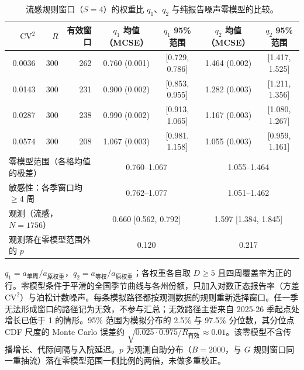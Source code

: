\begin{table}[htbp]
\centering
\footnotesize
\setlength{\tabcolsep}{3pt}
\caption{流感规则窗口（$S=4$）的权重比 $q_1$、$q_2$ 与纯报告噪声零模型的比较。}
\label{tab:s6}
\begin{tabular}{rrrcccc}
\toprule
$\mathrm{CV}^2$ & $R$ & 有效窗口 & $q_1$ 均值（MCSE） & $q_1$ 95\% 范围 & $q_2$ 均值（MCSE） & $q_2$ 95\% 范围 \\
\midrule
0.0036 & 300 & 262 & 0.760 (0.001) & [0.729, 0.786] & 1.464 (0.002) & [1.417, 1.525] \\
0.0143 & 300 & 231 & 0.900 (0.002) & [0.853, 0.955] & 1.282 (0.003) & [1.211, 1.356] \\
0.0287 & 300 & 238 & 0.990 (0.002) & [0.913, 1.065] & 1.167 (0.003) & [1.080, 1.267] \\
0.0574 & 300 & 208 & 1.067 (0.003) & [0.981, 1.158] & 1.055 (0.003) & [0.959, 1.161] \\
\midrule
\multicolumn{3}{l}{零模型范围（各格均值的极差）} & \multicolumn{2}{c}{0.760--1.067} & \multicolumn{2}{c}{1.055--1.464} \\
\multicolumn{3}{l}{敏感性：各季窗口均 $\ge4$ 周} & \multicolumn{2}{c}{0.762--1.077} & \multicolumn{2}{c}{1.051--1.462} \\
\multicolumn{3}{l}{观测（流感，$N=1756$）} & \multicolumn{2}{c}{0.660 [0.562, 0.792]} & \multicolumn{2}{c}{1.597 [1.384, 1.845]} \\
\multicolumn{3}{l}{观测落在零模型范围外的 $p$} & \multicolumn{2}{c}{0.120} & \multicolumn{2}{c}{0.217} \\
\bottomrule
\end{tabular}
\par\smallskip
\begin{minipage}{0.95\linewidth}\scriptsize $q_1=a_{\text{单周}}/a_{\text{原权重}}$，$q_2=a_{\text{等权}}/a_{\text{原权重}}$；各权重各自取 $D\ge5$ 且四周覆盖率为正的行。零模型条件于平滑的全国季节曲线与各州份额，只加入对数正态报告率（方差 $\mathrm{CV}^2$）与泊松计数噪声。每条模拟路径都按观测数据的规则重新选择窗口。任一季无法形成窗口的路径记为无效，不参与汇总；无效路径主要来自 2025-26 季起点处增长已低于 1 的情形。95\% 范围为模拟分布的 2.5\% 与 97.5\% 分位数，其分位点 CDF 尺度的 Monte Carlo 误差约 $\sqrt{0.025\cdot0.975/R_{\text{有效}}}\approx0.01$。该零模型不含传播增长、代际间隔与入院延迟。$p$ 为观测自助分布（$B=2000$，与 $G$ 规则窗口同一重抽流）落在零模型范围一侧比例的两倍，未做多重校正。\end{minipage}
\end{table}
